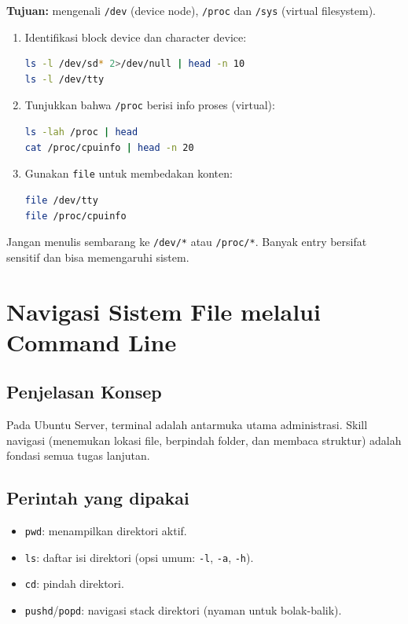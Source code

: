\textbf{Tujuan:} mengenali \texttt{/dev} (device node), \texttt{/proc} dan \texttt{/sys} (virtual filesystem).

\begin{enumerate}
    \item Identifikasi block device dan character device:
\begin{lstlisting}[language=bash, caption={Block vs character device}]
ls -l /dev/sd* 2>/dev/null | head -n 10
ls -l /dev/tty
\end{lstlisting}

    \item Tunjukkan bahwa \texttt{/proc} berisi info proses (virtual):
\begin{lstlisting}[language=bash, caption={Membaca informasi sistem dari /proc}]
ls -lah /proc | head
cat /proc/cpuinfo | head -n 20
\end{lstlisting}

    \item Gunakan \texttt{file} untuk membedakan konten:
\begin{lstlisting}[language=bash, caption={Menguji tipe konten dengan file}]
file /dev/tty
file /proc/cpuinfo
\end{lstlisting}
\end{enumerate}

\begin{warningbox}
Jangan menulis sembarang ke \texttt{/dev/*} atau \texttt{/proc/*}. Banyak entry bersifat sensitif dan bisa memengaruhi sistem.
\end{warningbox}

\section{Navigasi Sistem File melalui Command Line}
\label{sec:navigasi}

\subsection*{Penjelasan Konsep}
Pada Ubuntu Server, terminal adalah antarmuka utama administrasi.
Skill navigasi (menemukan lokasi file, berpindah folder, dan membaca struktur) adalah fondasi semua tugas lanjutan.

\subsection*{Perintah yang dipakai}
\begin{itemize}
    \item \texttt{pwd}: menampilkan direktori aktif.
    \item \texttt{ls}: daftar isi direktori (opsi umum: \texttt{-l}, \texttt{-a}, \texttt{-h}).
    \item \texttt{cd}: pindah direktori.
    \item \texttt{pushd}/\texttt{popd}: navigasi stack direktori (nyaman untuk bolak-balik).
\end{itemize}

